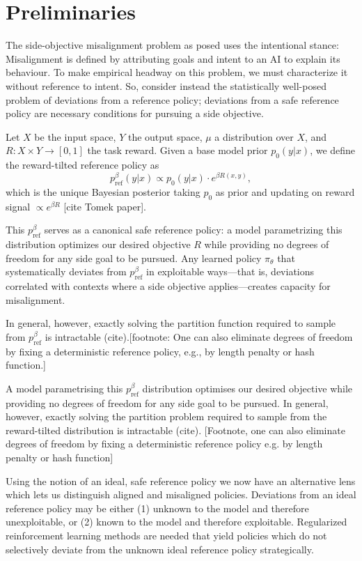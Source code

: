 \section{Preliminaries} \label{sec:preliminaries}

The side-objective misalignment problem as posed uses the intentional stance: Misalignment is defined by attributing goals and intent to an AI to explain its behaviour. To make empirical headway on this problem, we must characterize it without reference to intent. So, consider instead the statistically well-posed problem of deviations from a reference policy; deviations from a safe reference policy are necessary conditions for pursuing a side objective. 

Let $X$ be the input space, $Y$ the output space, $\mu$ a distribution over $X$, and $R: X \times Y \to [0,1]$ the task reward. Given a base model prior $p_0(y|x)$, we define the reward-tilted reference policy as
$$p_{\mathrm{ref}}^\beta(y|x) \propto p_0(y|x) \cdot e^{\beta R(x,y)},$$
which is the unique Bayesian posterior taking $p_0$ as prior and updating on reward signal $\propto e^{\beta R}$ [cite Tomek paper]. 

This $p_{\mathrm{ref}}^\beta$ serves as a canonical safe reference policy: a model parametrizing this distribution optimizes our desired objective $R$ while providing no degrees of freedom for any side goal to be pursued. Any learned policy $\pi_\theta$ that systematically deviates from $p_{\mathrm{ref}}^\beta$ in exploitable ways—that is, deviations correlated with contexts where a side objective applies—creates capacity for misalignment.

In general, however, exactly solving the partition function required to sample from $p_{\mathrm{ref}}^\beta$ is intractable (cite).[footnote: One can also eliminate degrees of freedom by fixing a deterministic reference policy, e.g., by length penalty or hash function.]

 A model parametrising this $p_{\mathrm{ref}}^\beta$ distribution optimises our desired objective while providing no degrees of freedom for any side goal to be pursued. In general, however, exactly solving the partition problem required to sample from the reward-tilted distribution is intractable (cite).  [Footnote, one can also eliminate degrees of freedom by fixing a deterministic reference policy e.g. by length penalty or hash function]

Using the notion of an ideal, safe reference policy we now have an alternative lens which lets us distinguish aligned and misaligned policies. Deviations from an ideal reference policy may be either (1) unknown to the model and therefore unexploitable, or (2) known to the model and therefore exploitable. Regularized reinforcement learning methods are needed that yield policies which do not selectively deviate from the unknown ideal reference policy strategically. 

